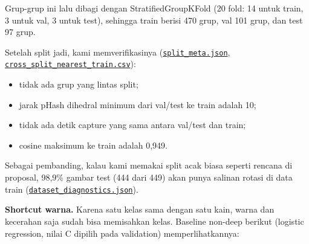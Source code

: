 \documentclass[10pt,a4paper]{article}
\providecommand{\tightlist}{\setlength{\itemsep}{2pt}\setlength{\parskip}{0pt}}
\begin{document}
Grup-grup ini lalu dibagi dengan StratifiedGroupKFold (20 fold: 14 untuk train, 3 untuk val, 3 untuk test), sehingga train berisi 470 grup, val 101 grup, dan test 97 grup.

Setelah split jadi, kami memverifikasinya (\href{https://github.com/Universitas-Cakrawala/semarang-batik-fine-grained-transfer-learning/blob/main/data/manifests/split_meta.json}{\texttt{split\_\allowbreak{}meta.json}}, \href{https://github.com/Universitas-Cakrawala/semarang-batik-fine-grained-transfer-learning/blob/main/data/manifests/cross_split_nearest_train.csv}{\texttt{cross\_\allowbreak{}split\_\allowbreak{}nearest\_\allowbreak{}train.csv}}):

\begin{itemize}
\tightlist
\item
  tidak ada grup yang lintas split;
\item
  jarak pHash dihedral minimum dari val/test ke train adalah 10;
\item
  tidak ada detik capture yang sama antara val/test dan train;
\item
  cosine maksimum ke train adalah 0,949.
\end{itemize}

Sebagai pembanding, kalau kami memakai split acak biasa seperti rencana di proposal, 98,9\% gambar test (444 dari 449) akan punya salinan rotasi di data train (\href{https://github.com/Universitas-Cakrawala/semarang-batik-fine-grained-transfer-learning/blob/main/artifacts/metrics/dataset_diagnostics.json}{\texttt{dataset\_\allowbreak{}diagnostics.json}}).

\textbf{Shortcut warna.} Karena satu kelas sama dengan satu kain, warna dan kecerahan saja sudah bisa memisahkan kelas. Baseline non-deep berikut (logistic regression, nilai C dipilih pada validation) memperlihatkannya:
\end{document}
